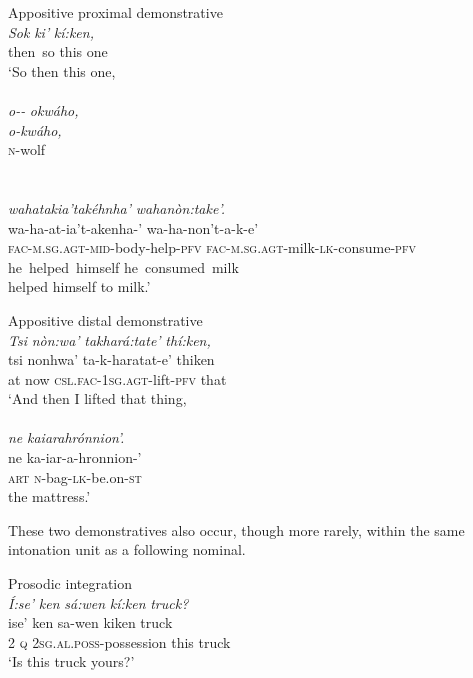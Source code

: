 \documentclass[output=paper]{langscibook}
\begin{document}
\ea%
    \label{ex:mithun:5}
    Appositive proximal demonstrative\\
    \gll \textit{Sok}    \textit{ki’}   \textit{kí:ken,}\\
     {then~so}  this one\\
    \glt ‘So then this one,\\
    ~\\
    \glll \textit{o-{}-}  \textit{okwáho,}\\
    {} \textit{o-kwáho,}\\
    {} \textsc{n}{}-wolf\\
    \\
    ~\\
   \gllll \textit{wahatakia’takéhnha’}          \textit{wahanòn:take’.}\\
    wa-ha-at-ia’t-akenha-’          wa-ha-non’t-a-k-e’\\
    \textsc{fac-m.sg.agt-mid-}body-help-\textsc{pfv}    \textsc{fac-m.sg.agt}{}-milk-\textsc{lk-}consume\textsc{{}-pfv}\\
    {he~helped~himself}            {he~consumed~milk}\\
   \glt helped himself to milk.’ \\                   
\z

\ea%
    \label{ex:mithun:6}
    Appositive distal demonstrative\\
    \glll \textit{Tsi}    \textit{nòn:wa’}    \textit{takhará:tate’}                \textit{thí:ken,}\\
    tsi    nonhwa’    ta-k-haratat-e’    thiken\\
    at      now     \textsc{csl.fac-1sg.agt-}lift-\textsc{pfv}    that\\
    \glt ‘And then I lifted that thing,\\
    ~\\
    \glll    \textit{ne}    \textit{kaiarahrónnion’.}\\
    ne    ka-iar-a-hronnion-’\\
    \textsc{art}    \textsc{n}{}-bag-\textsc{lk}{}-be.on-\textsc{st}\\
     \glt the     mattress.’   \\             
\z

These two demonstratives also occur, though more rarely, within the same intonation unit as a following nominal.

\newpage
\ea%
    \label{ex:mithun:7}
Prosodic integration\\
\glll \textit{Í:se’}  \textit{ken}    \textit{sá:wen}                \textit{kí:ken}  \textit{truck?}\\
ise’    ken    sa-wen                kiken  truck\\
2        \textsc{q}    \textsc{2sg.al.poss}{}-possession  this    truck\\
\glt ‘Is this truck yours?’ \\               
\z
\end{document}
